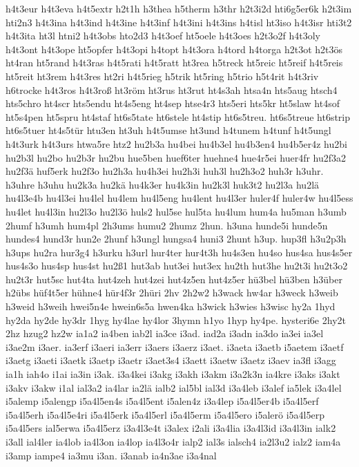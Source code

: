 {h4t3eur
h4t3eva
h4t5extr
h2t1h
h3thea
h5therm
h3thr
h2t3i2d
hti6g5er6k
h2t3im
hti2n3
h4t3ina
h4t3ind
h4t3ine
h4t3inf
h4t3ini
h4t3ins
h4tisl
ht3iso
h4t3isr
hti3t2
h4t3ita
ht3l
htni2
h4t3obs
hto2d3
h4t3oef
ht5oele
h4t3oes
h2t3o2f
h4t3oly
h4t3ont
h4t3ope
ht5opfer
h4t3opi
h4topt
h4t3ora
h4tord
h4torga
h2t3ot
h2t3ös
ht4ran
ht5rand
h4t3ras
h4t5rati
h4t5ratt
ht3rea
h5treck
ht5reic
ht5reif
h4t5reis
ht5reit
ht3rem
h4t3res
ht2ri
h4t5rieg
h5trik
ht5ring
h5trio
h5t4rit
h4t3riv
h6trocke
h4t3ros
h4t3roß
ht3röm
ht3rus
ht3rut
ht4s3ah
htsa4n
hts5aug
htsch4
hts5chro
ht4scr
hts5endu
ht4s5eng
ht4sep
htse4r3
hts5eri
hts5kr
ht5slaw
ht4sof
ht5s4pen
ht5spru
ht4staf
ht6s5tate
ht6stele
ht4stip
ht6s5treu.
ht6s5treue
ht6strip
ht6s5tuer
ht4s5tür
htu3en
ht3uh
h4t5umse
ht3und
h4tunem
h4tunf
h4t5ungl
h4t3urk
h4t3urs
htwa5re
htz2
hu2b3a
hu4bei
hu4b3el
hu4b3en4
hu4b5er4z
hu2bi
hu2b3l
hu2bo
hu2b3r
hu2bu
hue5ben
huef6ter
huehne4
hue4r5ei
huer4fr
hu2f3a2
hu2f3ä
huf5erk
hu2f3o
hu2h3a
hu4h3ei
hu2h3i
huh3l
hu2h3o2
huh3r
h3uhr.
h3uhre
h3uhu
hu2k3a
hu2kä
hu4k3er
hu4k3in
hu2k3l
huk3t2
hu2l3a
hu2lä
hu4l3e4b
hu4l3ei
hu4lel
hu4lem
hu4l5eng
hu4lent
hu4l3er
huler4f
huler4w
hu4l5ess
hu4let
hu4l3in
hu2l3o
hu2l3ö
huls2
hul5se
hul5ta
hu4lum
hum4a
hu5man
h3umb
2humf
h3umh
hum4pl
2h3ums
humu2
2humz
2hun.
h3una
hunde5i
hunde5n
hundes4
hund3r
hun2e
2hunf
h3ungl
hungsa4
huni3
2hunt
h3up.
hup3fl
h3u2p3h
h3ups
hu2ra
hur3g4
h3urku
h3url
hur4ter
hur4t3h
hu4s3en
hu4so
hus4sa
hus4s5er
hus4s3o
hus4sp
hus4st
hu2ß1
hut3ab
hut3ei
hut3ex
hu2th
hut3he
hu2t3i
hu2t3o2
hu2t3r
hut5sc
hut4ta
hut4zeh
hut4zei
hut4z5en
hut4z5er
hü3bel
hü3ben
h3über
h2übs
hüf4t5er
hühne4
hür4f3r
2hüri
2hv
2h2w2
h3wack
hw4ar
h3weck
h3weib
h3weid
h3weih
hwei5n4e
hwein6s5a
hwen4ka
h3wick
h3wies
h3wisc
hy2a
1hyd
hy2da
hy2de
hy3dr
1hyg
hy4lae
hy4lor
3hymn
h1yo
1hyp
hy4pe.
hysteri6e
2hy2t
2hz
hzug2
hz2w
ia1a2
ia4ben
iab2l
ia3ce
i3ad.
iad2a
i3adn
ia3do
ia3ei
ia3el
i3ae2m
i3aer.
ia3erf
i3aeri
ia3err
i3aers
i3aerz
i3aet.
i3aeta
i3aetb
i5aetem
i3aetf
i3aetg
i3aeti
i3aetk
i3aetp
i3aetr
i3aet3s4
i3aett
i3aetw
i3aetz
i3aev
ia3fl
i3agg
ia1h
iah4o
i1ai
ia3in
i3ak.
i3a4kei
i3akg
i3akh
i3akm
i3a2k3n
ia4kre
i3aks
i3akt
i3akv
i3akw
i1al
ial3a2
ia4lar
ia2lä
ialb2
ial5bl
ial3d
i3a4leb
i3alef
ia5lek
i3a4lel
i5alemp
i5alengp
i5a4l5en4s
i5a4l5ent
i5alen4z
i3a4lep
i5a4l5er4b
i5a4l5erf
i5a4l5erh
i5a4l5e4ri
i5a4l5erk
i5a4l5erl
i5a4l5erm
i5a4l5ero
i5alerö
i5a4l5erp
i5a4l5ers
ial5erwa
i5a4l5erz
i3a4l3e4t
i3alex
i2ali
i3a4lia
i3a4l3id
i3a4l3in
ialk2
i3all
ial4ler
ia4lob
ia4l3on
ia4lop
ia4l3o4r
ialp2
ial3s
ialsch4
ia2l3u2
ialz2
iam4a
i3amp
iampe4
ia3mu
i3an.
i3anab
ia4n3ae
i3a4nal
}
